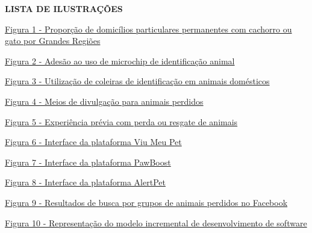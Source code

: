 \thispagestyle{empty}

\begin{center}
    \textbf{\large LISTA DE ILUSTRAÇÕES}
\end{center}

\vspace{0.8cm}

\noindent \hyperref[fig:ibge_domicilios_animais]{Figura 1 - Proporção de domicílios particulares permanentes com cachorro ou gato por Grandes Regiões \dotfill \pageref{fig:ibge_domicilios_animais}}\par\vspace{0.12cm}
\noindent \hyperref[fig:adocao_microchip]{Figura 2 - Adesão ao uso de microchip de identificação animal \dotfill \pageref{fig:adocao_microchip}}\par\vspace{0.12cm}
\noindent \hyperref[fig:uso_coleira]{Figura 3 - Utilização de coleiras de identificação em animais domésticos \dotfill \pageref{fig:uso_coleira}}\par\vspace{0.12cm}
\noindent \hyperref[fig:pesquisa_meios]{Figura 4 - Meios de divulgação para animais perdidos \dotfill \pageref{fig:pesquisa_meios}}\par\vspace{0.12cm}
\noindent \hyperref[fig:experiencia_perda]{Figura 5 - Experiência prévia com perda ou resgate de animais \dotfill \pageref{fig:experiencia_perda}}\par\vspace{0.12cm}
\noindent \hyperref[fig:viumeupet]{Figura 6 - Interface da plataforma Viu Meu Pet \dotfill \pageref{fig:viumeupet}}\par\vspace{0.12cm}
\noindent \hyperref[fig:pawboost]{Figura 7 - Interface da plataforma PawBoost \dotfill \pageref{fig:pawboost}}\par\vspace{0.12cm}
\noindent \hyperref[fig:alertpet]{Figura 8 - Interface da plataforma AlertPet \dotfill \pageref{fig:alertpet}}\par\vspace{0.12cm}
\noindent \hyperref[fig:facebook]{Figura 9 - Resultados de busca por grupos de animais perdidos no Facebook \dotfill \pageref{fig:facebook}}\par\vspace{0.12cm}
\noindent \hyperref[fig:ciclo_incremental_wefind]{Figura 10 - Representação do modelo incremental de desenvolvimento de software \dotfill \pageref{fig:ciclo_incremental_wefind}}\par\vspace{0.12cm}
